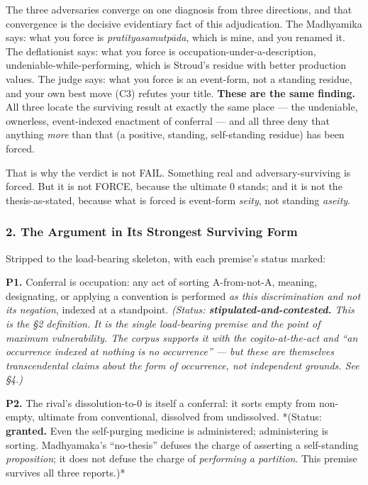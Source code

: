 \documentclass[11pt]{article}
\begin{document}
The three adversaries converge on one diagnosis from three directions, and that convergence is the decisive evidentiary fact of this adjudication. The Madhyamika says: what you force is \emph{pratītyasamutpāda}, which is mine, and you renamed it. The deflationist says: what you force is occupation-under-a-description, undeniable-while-performing, which is Stroud's residue with better production values. The judge says: what you force is an event-form, not a standing residue, and your own best move (C3) refutes your title. \textbf{These are the same finding.} All three locate the surviving result at exactly the same place — the undeniable, ownerless, event-indexed enactment of conferral — and all three deny that anything \emph{more} than that (a positive, standing, self-standing residue) has been forced.

That is why the verdict is not FAIL. Something real and adversary-surviving is forced. But it is not FORCE, because the ultimate 0 stands; and it is not the thesis-as-stated, because what is forced is event-form \emph{seity}, not standing \emph{aseity}.

\subsubsection*{2. The Argument in Its Strongest Surviving Form}

Stripped to the load-bearing skeleton, with each premise's status marked:

\textbf{P1.} Conferral is occupation: any act of sorting A-from-not-A, meaning, designating, or applying a convention is performed \emph{as this discrimination and not its negation}, indexed at a standpoint. \emph{(Status: \textbf{stipulated-and-contested.} This is the §2 definition. It is the single load-bearing premise and the point of maximum vulnerability. The corpus supports it with the cogito-at-the-act and ``an occurrence indexed at nothing is no occurrence'' — but these are themselves transcendental claims about the form of occurrence, not independent grounds. See §4.)}

\textbf{P2.} The rival's dissolution-to-0 is itself a conferral: it sorts empty from non-empty, ultimate from conventional, dissolved from undissolved. *(Status: \textbf{granted.} Even the self-purging medicine is administered; administering is sorting. Madhyamaka's ``no-thesis'' defuses the charge of asserting a self-standing \emph{proposition}; it does not defuse the charge of \emph{performing a partition}. This premise survives all three reports.)*
\end{document}
